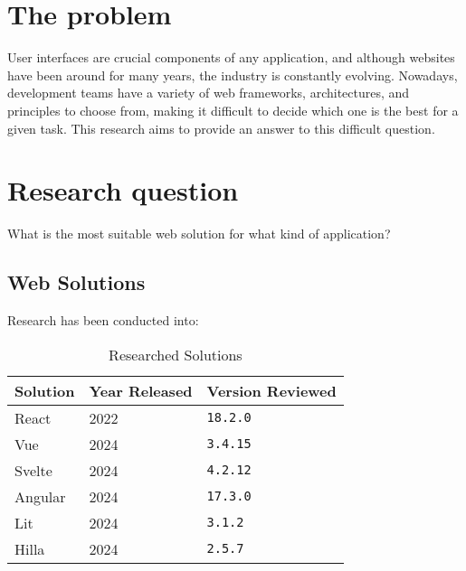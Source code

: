 \section{The problem}

User interfaces are crucial components of any application, and although websites have been around for many years, the industry is constantly evolving. Nowadays, development teams have a variety of web frameworks, architectures, and principles to choose from, making it difficult to decide which one is the best for a given task. This research aims to provide an answer to this difficult question.

\section{Research question}

What is the most suitable web solution for what kind of application?

\subsection{Web Solutions}
\label{subsec:intro:research:web_solutions}

Research has been conducted into:

\begin{table}[H]
    \centering
    \begin{tabular}{|l|l|l|}
        \hline
        Solution & Year Released & Version Reviewed \\
        \hline
        React    & 2022          & \texttt{18.2.0}  \\ \hline
        Vue      & 2024          & \texttt{3.4.15}  \\ \hline
        Svelte   & 2024          & \texttt{4.2.12}  \\ \hline
        Angular  & 2024          & \texttt{17.3.0}  \\ \hline
        Lit      & 2024          & \texttt{3.1.2}   \\ \hline
        Hilla    & 2024          & \texttt{2.5.7}   \\ \hline
    \end{tabular}
    \caption{Researched Solutions}
    \label{tab:researched_solutions}
\end{table}

